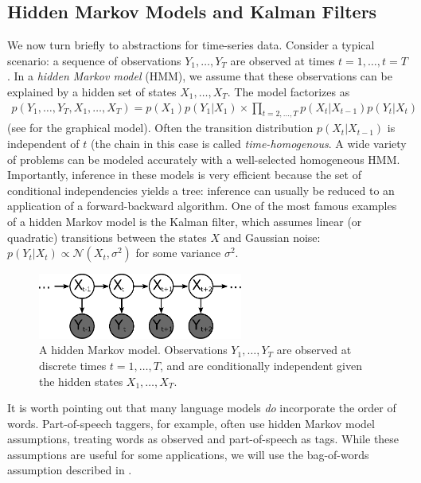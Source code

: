 \subsection{Hidden Markov Models and Kalman Filters}
We now turn briefly to abstractions for time-series data.  Consider a
typical scenario: a sequence of observations $Y_1, \ldots, Y_T$ are
observed at times $t=1, \ldots, t=T$.  In a \emph{hidden Markov model}
(HMM), we assume that these observations can be explained by a hidden set of states $X_1, \ldots, X_T$.  The model factorizes as
\begin{align}
  p(Y_1, \ldots, Y_T, X_1, \ldots, X_T) = p(X_1) p(Y_1 | X_1) \times \prod_{t=2, \ldots, T} p(X_t | X_{t-1}) p(Y_t | X_t)
\end{align}
(see  for the graphical model).  Often the transition
distribution $p(X_t | X_{t-1})$ is independent of $t$ (the chain in
this case is called \emph{time-homogenous}.  A wide variety of
problems can be modeled accurately with a well-selected homogeneous
HMM.  Importantly, inference in these models is very efficient because
the set of conditional independencies yields a tree: inference can
usually be reduced to an application of a forward-backward algorithm.
One of the most famous examples of a hidden Markov model is the Kalman
filter, which assumes linear (or quadratic) transitions between the
states $X$ and Gaussian noise: $p(Y_t | X_t) \propto \mathcal{N}(X_t,
\sigma^2)$ for some variance $\sigma^2$.
\begin{figure}
  \begin{center}
  \includegraphics[width=0.6\textwidth]{chapter_introductory_material/figs/hmm_gm.pdf}
  \end{center}
  \caption{A hidden Markov model.  Observations $Y_1, \ldots, Y_T$ are observed at discrete times $t=1, \ldots, T$, and are conditionally independent given the hidden states $X_1, \ldots, X_T$.}
  \label{figure:bagofwords_lda_gm}
\end{figure}

It is worth pointing out that many language models \emph{do}
incorporate the order of words.  Part-of-speech taggers, for example,
often use hidden Markov model assumptions, treating words as observed
and part-of-speech as tags.  While these assumptions are useful for
some applications, we will use the bag-of-words assumption described
in .

